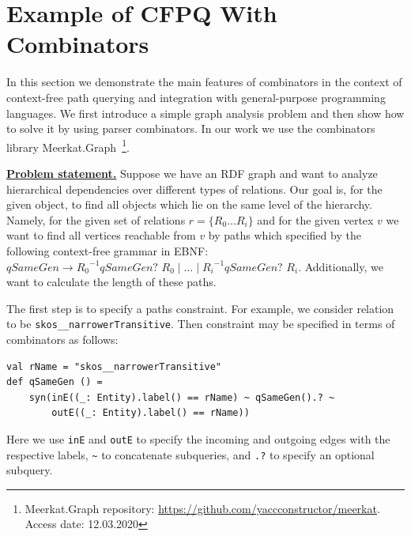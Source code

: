 \section{Example of CFPQ With Combinators}\label{sect:combinators}

In this section we demonstrate the main features of combinators in the context of context-free path querying and integration with general-purpose programming languages.
We first introduce a simple graph analysis problem and then show how to solve it by using parser combinators.
In our work we use the combinators library Meerkat.Graph~\footnote{Meerkat.Graph repository: \url{https://github.com/yaccconstructor/meerkat}. Access date: 12.03.2020}.

\underline{\textbf{Problem statement.}}
Suppose we have an RDF graph and want to analyze hierarchical dependencies over different types of relations.
Our goal is, for the given object, to find all objects which lie on the same level of the hierarchy.
Namely, for the given set of relations $r = \{R_0 \ldots R_i\}$ and for the given vertex $v$ we want to find all vertices reachable from $v$ by paths which specified by the following context-free grammar in EBNF:
 $\textit{qSameGen} \to {R_0}^{-1} \textit{qSameGen? } R_0 \mid \ldots \mid {R_i}^{-1} \textit{qSameGen? } R_i.$
Additionally, we want to calculate the length of these paths.


The first step is to specify a paths constraint.
For example, we consider relation to be \verb|skos__narrowerTransitive|.
Then constraint may be specified in terms of combinators as follows:

\begin{lstlisting}
val rName = "skos__narrowerTransitive"
def qSameGen () =
    syn(inE((_: Entity).label() == rName) ~ qSameGen().? ~
        outE((_: Entity).label() == rName))
\end{lstlisting}

Here we use \verb|inE| and \verb|outE| to specify the incoming and outgoing edges with the respective labels, \verb|~| to concatenate subqueries, and \verb|.?| to specify an optional subquery.

